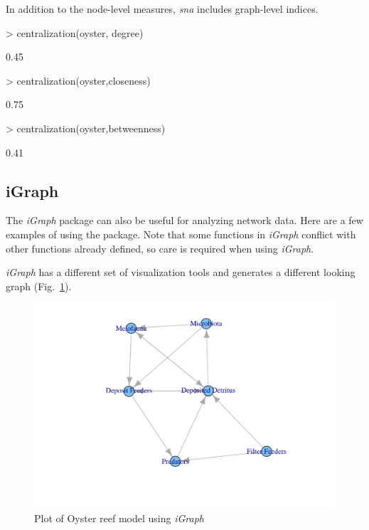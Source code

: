 \documentclass[article]{jss}
\begin{document}
In addition to the node-level measures, \textit{sna} includes graph-level
indices.

\begin{Schunk}
\begin{Sinput}
> centralization(oyster, degree)
\end{Sinput}
\begin{Soutput}
[1] 0.45
\end{Soutput}
\begin{Sinput}
> centralization(oyster,closeness)
\end{Sinput}
\begin{Soutput}
[1] 0.75
\end{Soutput}
\begin{Sinput}
> centralization(oyster,betweenness)
\end{Sinput}
\begin{Soutput}
[1] 0.41
\end{Soutput}
\end{Schunk}

\subsection{iGraph}
The \textit{iGraph} package can also be useful for analyzing network
data.  Here are a few examples of using the package.  Note that some
functions in \textit{iGraph} conflict with other functions already defined, so
care is required when using \textit{iGraph}.

\begin{Schunk}
\end{Schunk}

\textit{iGraph} has a different set of visualization tools and
generates a different looking graph (Fig.~\ref{fig:igraph}).

\begin{figure}
\center
\includegraphics{enaR-vignette-056}
\caption{Plot of Oyster reef model using \textit{iGraph}}\label{fig:igraph}
\end{figure}
\end{document}

